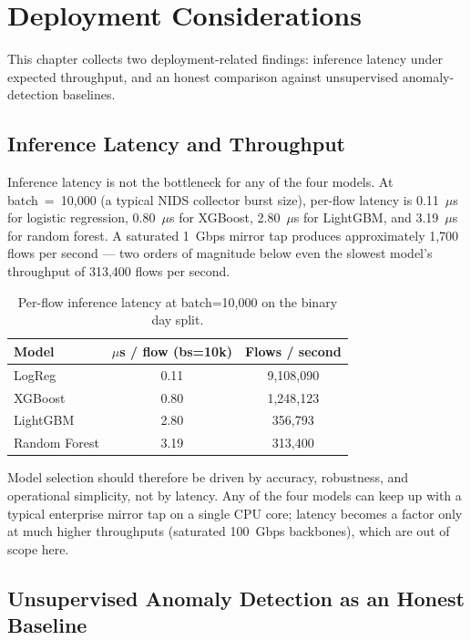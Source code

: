 \chapter{Deployment Considerations}
\label{ch:deployment}

This chapter collects two deployment-related findings: inference latency
under expected throughput, and an honest comparison against unsupervised
anomaly-detection baselines.

\section{Inference Latency and Throughput}

Inference latency is not the bottleneck for any of the four models. At
batch~=~10{,}000 (a typical NIDS collector burst size), per-flow latency
is 0.11~$\mu$s for logistic regression, 0.80~$\mu$s for XGBoost,
2.80~$\mu$s for LightGBM, and 3.19~$\mu$s for random forest. A
saturated 1~Gbps mirror tap produces approximately 1{,}700 flows per
second --- two orders of magnitude below even the slowest model's
throughput of 313{,}400 flows per second.

\begin{table}[H]
    \centering
    \caption{Per-flow inference latency at batch=10{,}000 on the binary day split.}
    \label{tab:latency}
    \small
    \begin{tabular}{lcc}
        \toprule
        \textbf{Model} & \textbf{$\mu$s / flow (bs=10k)} & \textbf{Flows / second} \\
        \midrule
        LogReg & 0.11 & 9{,}108{,}090 \\
        XGBoost & 0.80 & 1{,}248{,}123 \\
        LightGBM & 2.80 & 356{,}793 \\
        Random Forest & 3.19 & 313{,}400 \\
        \bottomrule
    \end{tabular}
\end{table}

Model selection should therefore be driven by accuracy, robustness, and
operational simplicity, not by latency. Any of the four models can keep
up with a typical enterprise mirror tap on a single CPU core; latency
becomes a factor only at much higher throughputs (saturated 100~Gbps
backbones), which are out of scope here.

\section{Unsupervised Anomaly Detection as an Honest Baseline}

